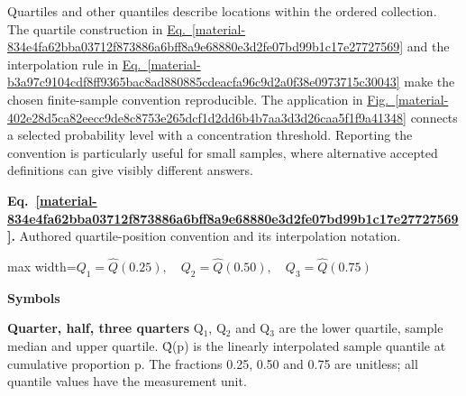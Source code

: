 \documentclass[11pt,a4paper]{article}
\begin{document}
Quartiles and other quantiles describe locations within the ordered collection. The quartile construction in \hyperref[material-834e4fa62bba03712f873886a6bff8a9e68880e3d2fe07bd99b1c17e27727569]{Eq.~\ref*{material-834e4fa62bba03712f873886a6bff8a9e68880e3d2fe07bd99b1c17e27727569}} and the interpolation rule in \hyperref[material-b3a97c9104cdf8ff9365bac8ad880885cdeacfa96c9d2a0f38e0973715c30043]{Eq.~\ref*{material-b3a97c9104cdf8ff9365bac8ad880885cdeacfa96c9d2a0f38e0973715c30043}} make the chosen finite-sample convention reproducible. The application in \hyperref[material-402e28d5ca82eecc9de8c8753e265dcf1d2dd6b4b7aa3d3d26caa5f1f9a41348]{Fig.~\ref*{material-402e28d5ca82eecc9de8c8753e265dcf1d2dd6b4b7aa3d3d26caa5f1f9a41348}} connects a selected probability level with a concentration threshold. Reporting the convention is particularly useful for small samples, where alternative accepted definitions can give visibly different answers.


\par\medskip
\begin{samepage}
\label{material-834e4fa62bba03712f873886a6bff8a9e68880e3d2fe07bd99b1c17e27727569}
\noindent\textbf{Eq.~\ref*{material-834e4fa62bba03712f873886a6bff8a9e68880e3d2fe07bd99b1c17e27727569}.} Authored quartile-position convention and its interpolation notation.\par\nopagebreak
\begin{center}\begin{adjustbox}{max width=\linewidth}$\displaystyle Q_1=\widehat Q(0.25),\quad Q_2=\widehat Q(0.50),\quad Q_3=\widehat Q(0.75)$\end{adjustbox}\end{center}

\par\noindent\textbf{Symbols}

\par\noindent\textbf{Quarter, half, three quarters} Q\ensuremath{{}_1}, Q\ensuremath{{}_2} and Q\ensuremath{{}_3} are the lower quartile, sample median and upper quartile. Q̂(p) is the linearly interpolated sample quantile at cumulative proportion p. The fractions 0.25, 0.50 and 0.75 are unitless; all quantile values have the measurement unit.

\end{samepage}
\medskip
\end{document}

